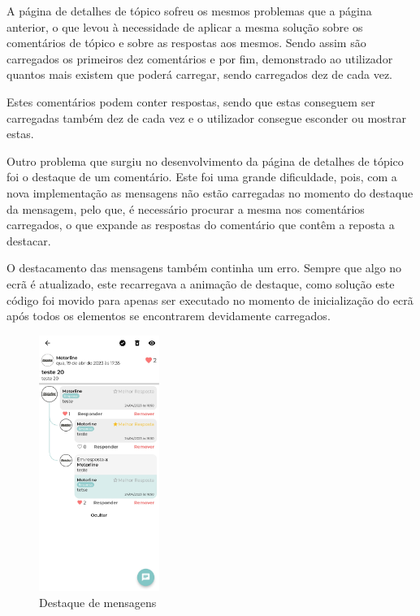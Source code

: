 A página de detalhes de tópico sofreu os mesmos problemas que a página anterior, o que levou à necessidade de aplicar a mesma solução sobre os comentários de tópico e sobre as respostas aos mesmos. Sendo assim são carregados os primeiros dez comentários e por fim, demonstrado ao utilizador quantos mais existem que poderá carregar, sendo carregados dez de cada vez.

Estes comentários podem conter respostas, sendo que estas conseguem ser carregadas também dez de cada vez e o utilizador consegue esconder ou mostrar estas.

Outro problema que surgiu no desenvolvimento da página de detalhes de tópico foi o destaque de um comentário. Este foi uma grande dificuldade, pois, com a nova implementação as mensagens não estão carregadas no momento do destaque da mensagem, pelo que, é necessário procurar a mesma nos comentários carregados, o que expande as respostas do comentário que contêm a reposta a destacar.

O destacamento das mensagens também continha um erro. Sempre que algo no ecrã é atualizado, este recarregava a animação de destaque, como solução este código foi movido para apenas ser executado no momento de inicialização do ecrã após todos os elementos se encontrarem devidamente carregados.

\begin{figure}[htb]
  \centering
  \includegraphics[width=0.35\textwidth]{images/implementacao/frontend/forum/loading_topics/1686062701127.jpg}
  \caption{Destaque de mensagens}
  \label{fig:75}
\end{figure}
